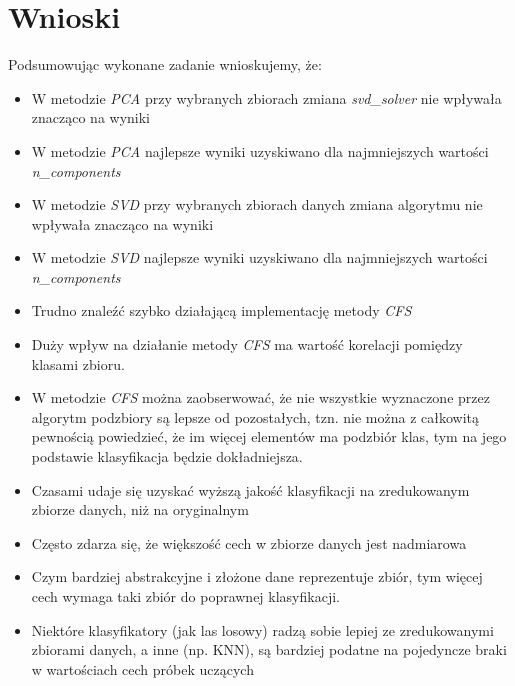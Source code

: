 \documentclass{classrep}
\begin{document}
    \section{Wnioski}
    \label{conclusions} {
        Podsumowując wykonane zadanie wnioskujemy, że:
        \begin{itemize}
            \item W metodzie \textit{PCA} przy wybranych zbiorach zmiana
            \textit{svd\_solver} nie wpływała znacząco na wyniki
            \item W metodzie \textit{PCA} najlepsze wyniki uzyskiwano dla najmniejszych
            wartości \textit{n\_components}
            \item W metodzie \textit{SVD} przy wybranych zbiorach danych zmiana
            algorytmu nie wpływała znacząco na wyniki
            \item W metodzie \textit{SVD} najlepsze wyniki uzyskiwano dla najmniejszych
            wartości \textit{n\_components}
            \item Trudno znaleźć szybko działającą implementację metody \textit{CFS}
            \item Duży wpływ na działanie metody \textit{CFS} ma wartość korelacji pomiędzy klasami zbioru.
            \item W metodzie \textit{CFS} można zaobserwować, że nie wszystkie wyznaczone przez
            algorytm podzbiory są lepsze od pozostałych, tzn. nie można z całkowitą pewnością powiedzieć,
            że im więcej elementów ma podzbiór klas, tym na jego podstawie klasyfikacja będzie dokładniejsza.
            \item Czasami udaje się uzyskać wyższą jakość klasyfikacji na zredukowanym zbiorze danych, niż na oryginalnym
            \item Często zdarza się, że większość cech w zbiorze danych jest nadmiarowa
            \item Czym bardziej abstrakcyjne i złożone dane reprezentuje zbiór, tym więcej cech wymaga
            taki zbiór do poprawnej klasyfikacji.
            \item Niektóre klasyfikatory (jak las losowy) radzą sobie lepiej ze zredukowanymi zbiorami
            danych, a inne (np. KNN), są bardziej podatne na pojedyncze braki w wartościach cech próbek uczących

        \end{itemize}
    }

    \begin{thebibliography}{0}
    \end{thebibliography}
\end{document}
